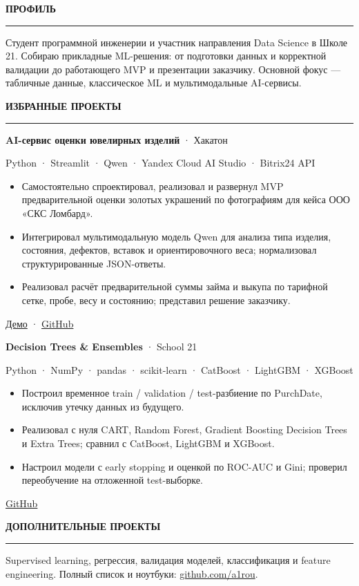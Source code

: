 \documentclass[10pt,a4paper]{article}
\newcommand{\sectiontitle}[1]{%
  \vspace{10pt}%
  {\color{accent}\fontsize{8.6}{10}\selectfont\bfseries\MakeUppercase{#1}}\par
  \vspace{3pt}\color{line}\rule{\linewidth}{0.55pt}\color{ink}\vspace{5pt}
}
\newcommand{\itemtitle}[2]{%
  {\fontsize{10.5}{12}\selectfont\bfseries #1}\hfill {\color{muted}\fontsize{8.6}{10}\selectfont #2}\par
}
\newcommand{\itemmeta}[1]{%
  {\color{slate}\fontsize{8.8}{10.5}\selectfont #1}\par\vspace{2pt}
}
\begin{document}
\begin{minipage}[t]{0.655\linewidth}
\sectiontitle{Профиль}
{\fontsize{9.4}{13}\selectfont
Студент программной инженерии и участник направления Data Science в Школе 21. Собираю прикладные ML-решения: от подготовки данных и корректной валидации до работающего MVP и презентации заказчику. Основной фокус — табличные данные, классическое ML и мультимодальные AI-сервисы.
}

\sectiontitle{Избранные проекты}
\itemtitle{AI-сервис оценки ювелирных изделий}{2026 · Хакатон}
\itemmeta{Python · Streamlit · Qwen · Yandex Cloud AI Studio · Bitrix24 API}
\begin{itemize}
  \item Самостоятельно спроектировал, реализовал и развернул MVP предварительной оценки золотых украшений по фотографиям для кейса ООО «СКС Ломбард».
  \item Интегрировал мультимодальную модель Qwen для анализа типа изделия, состояния, дефектов, вставок и ориентировочного веса; нормализовал структурированные JSON-ответы.
  \item Реализовал расчёт предварительной суммы займа и выкупа по тарифной сетке, пробе, весу и состоянию; представил решение заказчику.
\end{itemize}
{\fontsize{8.4}{10}\selectfont \href{https://airouu-hackathon.streamlit.app/}{Демо} \;·\; \href{https://github.com/a1rou/hackathon}{GitHub}}\par

\vspace{7pt}
\itemtitle{Decision Trees \& Ensembles}{2026 · School 21}
\itemmeta{Python · NumPy · pandas · scikit-learn · CatBoost · LightGBM · XGBoost}
\begin{itemize}
  \item Построил временное train / validation / test-разбиение по PurchDate, исключив утечку данных из будущего.
  \item Реализовал с нуля CART, Random Forest, Gradient Boosting Decision Trees и Extra Trees; сравнил с CatBoost, LightGBM и XGBoost.
  \item Настроил модели с early stopping и оценкой по ROC-AUC и Gini; проверил переобучение на отложенной test-выборке.
\end{itemize}
{\fontsize{8.4}{10}\selectfont \href{https://github.com/a1rou/ML5_Decision_trees_School21}{GitHub}}\par

\sectiontitle{Дополнительные проекты}
{\fontsize{8.9}{11.5}\selectfont
Supervised learning, регрессия, валидация моделей, классификация и feature engineering. Полный список и ноутбуки: \href{https://github.com/a1rou}{github.com/a1rou}.
}
\end{minipage}\hfill
\end{document}
